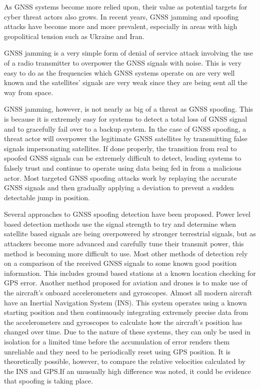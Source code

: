 \documentclass[conference]{IEEEtran}
\begin{document}
As GNSS systems become more relied upon, their value as potential targets for cyber threat actors also grows. In recent years, GNSS jamming and spoofing attacks have become more and more prevalent, especially in areas with high geopolitical tension such as Ukraine and Iran.

GNSS jamming is a very simple form of denial of service attack involving the use of a radio transmitter to overpower the GNSS signals with noise. This is very easy to do as the frequencies which GNSS systems operate on are very well known and the satellites’ signals are very weak since they are being sent all the way from space.

GNSS jamming, however, is not nearly as big of a threat as GNSS spoofing. This is because it is extremely easy for systems to detect a total loss of GNSS signal and to gracefully fail over to a backup system. In the case of GNSS spoofing, a threat actor will overpower the legitimate GNSS satellites by transmitting false signals impersonating satellites. If done properly, the transition from real to spoofed GNSS signals can be extremely difficult to detect, leading systems to falsely trust and continue to operate using data being fed in from a malicious actor. Most targeted GNSS spoofing attacks work by replaying the accurate GNSS signals and then gradually applying a deviation to prevent a sudden detectable jump in position.

Several approaches to GNSS spoofing detection have been proposed. Power level based detection methods use the signal strength to try and determine when satellite based signals are being overpowered by stronger terrestrial signals, but as attackers become more advanced and carefully tune their transmit power, this method is becoming more difficult to use. Most other methods of detection rely on a comparison of the received GNSS signals to some known good position information. This includes ground based stations at a known location checking for GPS error. Another method proposed for aviation and drones is to make use of the aircraft’s onboard accelerometers and gyroscopes. Almost all modern aircraft have an Inertial Navigation System (INS). This system operates using a known starting position and then continuously integrating extremely precise data from the accelerometers and gyroscopes to calculate how the aircraft’s position has changed over time. Due to the nature of these systems, they can only be used in isolation for a limited time before the accumulation of error renders them unreliable and they need to be periodically reset using GPS position. It is theoretically possible, however, to compare the relative velocities calculated by the INS and  GPS.\@ If an unusually high difference was noted, it could be evidence that spoofing is taking place\cite{meng2021}.
\end{document}
